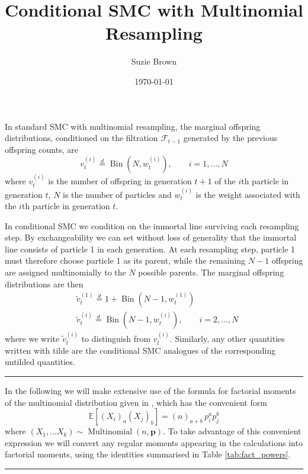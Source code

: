 \documentclass[fleqn]{article}
\title{Conditional SMC with Multinomial Resampling}
\author{Suzie Brown}
\date{\today}
\newcommand{\E}{\mathbb{E}}
\newcommand{\vt}[2][t]{v_{#1}^{(#2)}}
\newcommand{\vttilde}[2][t]{\tilde{v}_{#1}^{(#2)}}
\newcommand{\wt}[2][t]{w_{#1}^{(#2)}}
\newcommand{\eqdist}{\overset{d}{=}}
\newcommand{\Bin}{\operatorname{Bin}}
\newcommand{\Mn}{\operatorname{Multinomial}}
\newcommand{\F}{\mathcal{F}_{t-1}}
\newcommand{\myrule}{\\ \rule{\textwidth}{1pt}}
\begin{document}
\maketitle

In standard SMC with multinomial resampling, the marginal offspring distributions, conditioned on the filtration $\F$ generated by the previous offspring counts, are
\begin{equation*}
\vt{i} \eqdist \Bin (N, \wt{i}), \qquad i=1,\dots,N
\end{equation*}
where $\vt{i}$ is the number of offspring in generation $t+1$ of the $i$th particle in generation $t$, $N$ is the number of particles and $\wt{i}$ is the weight associated with the $i$th particle in generation $t$.

In conditional SMC we condition on the immortal line surviving each resampling step. By exchangeability we can set without loss of generality that the immortal line consists of particle 1 in each generation. At each resampling step, particle 1 must therefore choose particle 1 as its parent, while the remaining $N-1$ offspring are assigned multinomially to the $N$ possible parents. The marginal offspring distributions are then
\begin{align*}
& \vttilde{1} \eqdist 1 + \Bin(N-1, \wt{1}) \\
& \vttilde{i} \eqdist \Bin(N-1, \wt{i}), \qquad i=2,\dots,N
\end{align*}
where we write $\vttilde{i}$ to distinguish from $\vt{i}$. Similarly, any other quantities written with tilde are the conditional SMC analogues of the corresponding untilded quantities.
\myrule

In the following we will make extensive use of the formula for factorial moments of the multinomial distribution given in \citet[p.67]{mosimann1962}, which has the convenient form
\begin{equation*}
\E[(X_i)_a(X_j)_b] = (n)_{a+b}\, p_i^a p_j^b
\end{equation*}
where $(X_1,\dots X_k) \sim \Mn(n, \mathbf{p})$.
To take advantage of this convenient expression we will convert any regular moments appearing in the calculations into factorial moments, using the identities summarised in Table \ref{tab:fact_powers}.
\myrule
\end{document}

